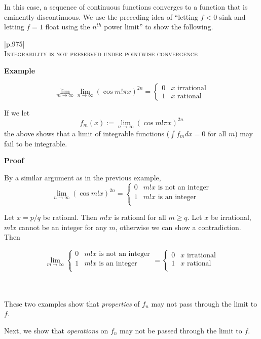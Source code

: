 \documentclass{article}
\newenvironment{myboxed}{\bigskip\noindent\begin{tabular}{|p{.975\linewidth}|}\hline \\}{\\\\\hline\end{tabular}\bigskip}
\begin{document}
In this case, a sequence of continuous functions converges to a function that is eminently discontinuous. We use the preceding idea of ``letting $f < 0$ sink and letting $f = 1$ float using the $n^{th}$ power limit'' to show the following.

\begin{myboxed}
    \textsc{Integrability is not preserved under pointwise convergence}

    \textbf{Example}

    \[\lim_{m \to \infty} \lim_{n \to \infty} (\cos m!\pi x ) ^{2n} = \begin{cases}
        0 & x\text{ irrational} \\
        1 & x\text{ rational}
    \end{cases}\]

    If we let 
    \[f_m (x) := \lim_{n \to \infty} (\cos m!\pi x)^{2n}\]
    the above shows that a limit of integrable functions ($\int f_m dx = 0$ for all $m$) may fail to be integrable.

    \textbf{Proof}

    By a similar argument as in the previous example,
    \[\lim_{n \to \infty} (\cos m!x)^{2n} = \begin{cases}
        0 & m!x\text{ is not an integer} \\
        1 & m!x\text{ is an integer} \\
    \end{cases}\]

    Let $x = p/q$ be rational. Then $m!x$ is rational for all $m \geq q$. Let $x$ be irrational, $m!x$ cannot be an integer for any $m$, otherwise we can show a contradiction. Then

    \[\lim_{m \to \infty} \begin{cases}
        0 & m!x\text{ is not an integer} \\
        1 & m!x\text{ is an integer} \\
        \end{cases} = \begin{cases}
        0 & x \text{ irrational} \\
        1 & x \text{ rational} \\
    \end{cases}\]
\end{myboxed}

These two examples show that \textit{properties} of $f_n$ may not pass through the limit to $f$. 

Next, we show that \textit{operations} on $f_n$ may not be passed through the limit to $f$.
\end{document}
